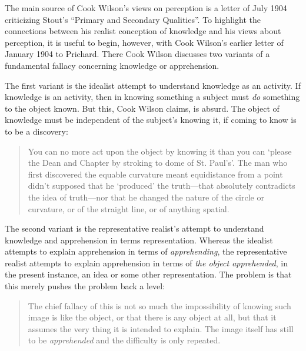 The main source of Cook Wilson's \citeyearpar[764--800]{Cook-Wilson:1926sf} views on perception is a letter of July 1904 criticizing Stout's \citeyearpar{Stout:1903zl} ``Primary and Secondary Qualities''. To highlight the connections between his realist conception of knowledge and his views about perception, it is useful to begin, however, with Cook Wilson's \citeyearpar[801--808]{Cook-Wilson:1926sf} earlier letter of January 1904 to Prichard. There Cook Wilson discusses two variants of a fundamental fallacy concerning knowledge or apprehension.

The first variant is the idealist attempt to understand knowledge as an activity. If knowledge is an activity, then in knowing something a subject must \emph{do} something to the object known. But this, Cook Wilson claims, is absurd. The object of knowledge must be independent of the subject's knowing it, if coming to know is to be a discovery: 
\begin{quote}
	You can no more act upon the object by knowing it than you can `please the Dean and Chapter by stroking to dome of St. Paul's'. The man who first discovered the equable curvature meant equidistance from a point didn't supposed that he `produced' the truth---that absolutely contradicts the idea of truth---nor that he changed the nature of the circle or curvature, or of the straight line, or of anything spatial. \citep[802]{Cook-Wilson:1926sf}
\end{quote}

The second variant is the representative realist's attempt to understand knowledge and apprehension in terms representation. Whereas the idealist attempts to explain apprehension in terms of \emph{apprehending}, the representative realist attempts to explain apprehension in terms of \emph{the object apprehended}, in the present instance, an idea or some other representation. The problem is that this merely pushes the problem back a level:
\begin{quote}
	The chief fallacy of this is not so much the impossibility of knowing such image is like the object, or that there is any object at all, but that it assumes the very thing it is intended to explain. The image itself has still to be \emph{apprehended} and the difficulty is only repeated. \citep[803]{Cook-Wilson:1926sf}
\end{quote}

